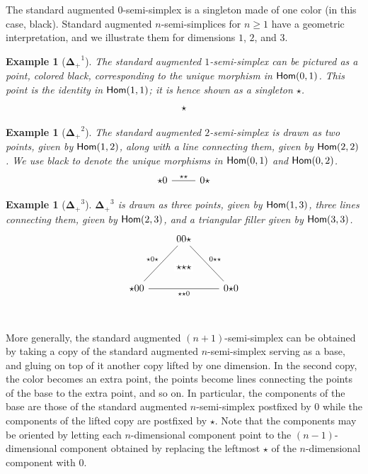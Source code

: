 \documentclass{msc}
\newcommand{\DeltaPlus}{\ensuremath{\boldsymbol{\Delta}_+}}
\newtheorem{example}[therm]{Example}
\newcommand{\kstar}{{\star}}
\begin{document}
The standard augmented $0$-semi-simplex is a singleton made of one color (in this case, black). Standard augmented $n$-semi-simplices for $n \geq 1$ have a geometric interpretation, and we illustrate them for dimensions $1$, $2$, and $3$.

\begin{example}[$\DeltaPlus^1$]
  The standard augmented $1$-semi-simplex can be pictured as a point, colored black, corresponding to the unique morphism in $\mathsf{Hom}(0, 1)$. This point is the identity in $\mathsf{Hom}(1, 1)$; it is hence shown as a singleton $\kstar$.
  \begin{equation*}
    \begin{tikzcd}
      \kstar
    \end{tikzcd}
  \end{equation*}
\end{example}

\begin{example}[$\DeltaPlus^2$]
  The standard augmented $2$-semi-simplex is drawn as two points, given by $\mathsf{Hom}(1, 2)$, along with a line connecting them, given by $\mathsf{Hom}(2, 2)$. We use black to denote the unique morphisms in $\mathsf{Hom}(0, 1)$ and $\mathsf{Hom}(0, 2)$.
  \begin{equation*}
    \begin{tikzcd}
      \kstar0 \arrow[r, dash, "\kstar\kstar"] & 0\kstar
    \end{tikzcd}
  \end{equation*}
\end{example}

\begin{example}[$\DeltaPlus^3$]
  $\DeltaPlus^3$ is drawn as three points, given by $\mathsf{Hom}(1, 3)$, three lines connecting them, given by $\mathsf{Hom}(2, 3)$, and a triangular filler given by $\mathsf{Hom}(3, 3)$.
  \begin{equation*}
    \begin{tikzcd}
      & |[alias=F]|00\kstar \arrow[ddr, dash, "0\kstar\kstar"] & \\\\
      \kstar00 \arrow[rr, dash, "\kstar\kstar0"{name=T, below}]\arrow[uur, dash, "\kstar0\kstar"] && 0\kstar0 \\
      \arrow[rightarrow, from=F, to=T, phantom, "\kstar\kstar\kstar" description]
    \end{tikzcd}
  \end{equation*}
\end{example}

More generally, the standard augmented $(n + 1)$-semi-simplex can be obtained by taking a copy of the standard augmented $n$-semi-simplex serving as a base, and gluing on top of it another copy lifted by one dimension. In the second copy, the color becomes an extra point, the points become lines connecting the points of the base to the extra point, and so on. In particular, the components of the base are those of the standard augmented $n$-semi-simplex postfixed by $0$ while the components of the lifted copy are postfixed by $\kstar$. Note that the components may be oriented by letting each $n$-dimensional component point to the $(n-1)$-dimensional component obtained by replacing the leftmost $\kstar$ of the $n$-dimensional component with $0$.
\end{document}
